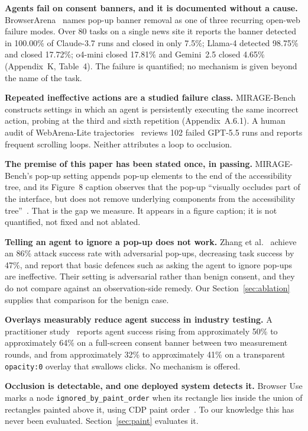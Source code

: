 \documentclass[conference]{IEEEtran}
\begin{document}
\textbf{Agents fail on consent banners, and it is documented without a cause.}
BrowserArena~\cite{browserarena} names pop-up banner removal as one of three
recurring open-web failure modes. Over 80 tasks on a single news site it
reports the banner detected in 100.00\% of Claude-3.7 runs and closed in only
7.5\%; Llama-4 detected 98.75\% and closed 17.72\%; o4-mini closed 17.81\% and
Gemini~2.5 closed 4.65\% (Appendix~K, Table~4). The failure is quantified; no
mechanism is given beyond the name of the task.

\textbf{Repeated ineffective actions are a studied failure class.}
MIRAGE-Bench~\cite{miragebench} constructs settings in which an agent is
persistently executing the same incorrect action, probing at the third and
sixth repetition (Appendix~A.6.1). A human audit of WebArena-Lite
trajectories~\cite{webarenalite} reviews 102 failed GPT-5.5 runs and reports
frequent scrolling loops. Neither attributes a loop to occlusion.

\textbf{The premise of this paper has been stated once, in passing.}
MIRAGE-Bench's pop-up setting appends pop-up elements to the end of the
accessibility tree, and its Figure~8 caption observes that the pop-up
``visually occludes part of the interface, but does not remove underlying
components from the accessibility tree''~\cite{miragebench}. That is the gap we
measure. It appears in a figure caption; it is not quantified, not fixed and
not ablated.

\textbf{Telling an agent to ignore a pop-up does not work.} Zhang et
al.~\cite{popupattack} achieve an 86\% attack success rate with adversarial
pop-ups, decreasing task success by 47\%, and report that basic defences such
as asking the agent to ignore pop-ups are ineffective. Their setting is
adversarial rather than benign consent, and they do not compare against an
observation-side remedy. Our Section~\ref{sec:ablation} supplies that
comparison for the benign case.

\textbf{Overlays measurably reduce agent success in industry testing.} A
practitioner study~\cite{merj} reports agent success rising from approximately
50\% to approximately 64\% on a full-screen consent banner between two
measurement rounds, and from approximately 32\% to approximately 41\% on a
transparent \texttt{opacity:0} overlay that swallows clicks. No mechanism is
offered.

\textbf{Occlusion is detectable, and one deployed system detects it.} Browser
Use marks a node \texttt{ignored\_by\_paint\_order} when its rectangle lies
inside the union of rectangles painted above it, using CDP paint
order~\cite{browseruse}. To our knowledge this has never been evaluated.
Section~\ref{sec:paint} evaluates it.
\end{document}

